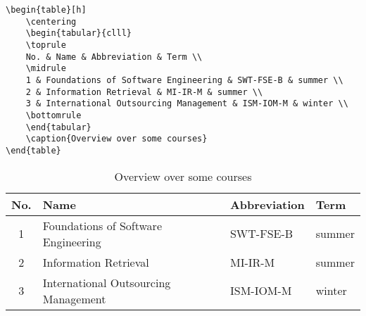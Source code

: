 \begin{verbatim}
\begin{table}[h]
	\centering
	\begin{tabular}{clll}
	\toprule
	No. & Name & Abbreviation & Term \\
	\midrule
	1 & Foundations of Software Engineering & SWT-FSE-B & summer \\
	2 & Information Retrieval & MI-IR-M & summer \\
	3 & International Outsourcing Management & ISM-IOM-M & winter \\		
	\bottomrule
	\end{tabular}
	\caption{Overview over some courses}
\end{table}
\end{verbatim}

\begin{table}[h]
	\centering
	\begin{tabular}{clll}
	\toprule
	No. & Name & Abbreviation & Term \\
	\midrule
	1 & Foundations of Software Engineering & SWT-FSE-B & summer \\
	2 & Information Retrieval & MI-IR-M & summer \\
	3 & International Outsourcing Management & ISM-IOM-M & winter \\			
	\bottomrule
	\end{tabular}
	\caption{Overview over some courses}
\end{table}
